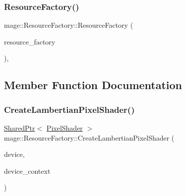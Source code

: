 \hypertarget{classmage_1_1_resource_factory_ab4e46a6c9ac15d1584c6e28bb1e65708}{}\label{classmage_1_1_resource_factory_ab4e46a6c9ac15d1584c6e28bb1e65708} 
\subsubsection{\texorpdfstring{Resource\+Factory()}{ResourceFactory()}\hspace{0.1cm}{\footnotesize\ttfamily [3/3]}}
{\footnotesize\ttfamily mage\+::\+Resource\+Factory\+::\+Resource\+Factory (\begin{DoxyParamCaption}\item[{\hyperlink{classmage_1_1_resource_factory}{Resource\+Factory} \&\&}]{resource\+\_\+factory }\end{DoxyParamCaption})\hspace{0.3cm}{\ttfamily [private]}, {\ttfamily [delete]}}



\subsection{Member Function Documentation}
\hypertarget{classmage_1_1_resource_factory_a5df89f6980eee2e982e606549daf087f}{}\label{classmage_1_1_resource_factory_a5df89f6980eee2e982e606549daf087f} 
\subsubsection{\texorpdfstring{Create\+Lambertian\+Pixel\+Shader()}{CreateLambertianPixelShader()}}
{\footnotesize\ttfamily \hyperlink{namespacemage_a1e01ae66713838a7a67d30e44c67703e}{Shared\+Ptr}$<$ \hyperlink{classmage_1_1_pixel_shader}{Pixel\+Shader} $>$ mage\+::\+Resource\+Factory\+::\+Create\+Lambertian\+Pixel\+Shader (\begin{DoxyParamCaption}\item[{I\+D3\+D11\+Device2 $\ast$}]{device,  }\item[{I\+D3\+D11\+Device\+Context2 $\ast$}]{device\+\_\+context }\end{DoxyParamCaption})}

